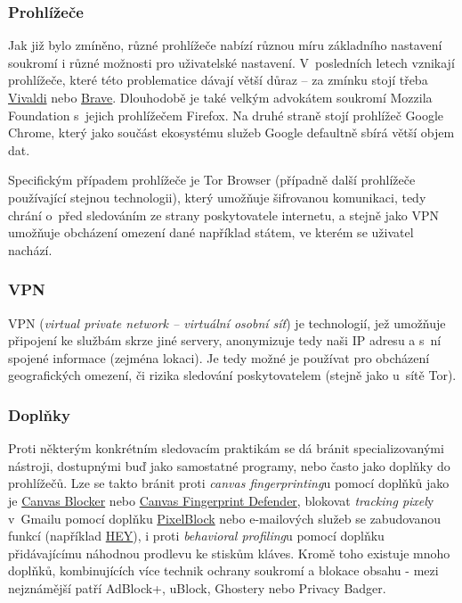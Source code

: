 \subsubsection*{Prohlížeče}
Jak již bylo zmíněno, různé prohlížeče nabízí různou míru základního nastavení soukromí i různé možnosti pro uživatelské nastavení.
V~posledních letech vznikají prohlížeče, které této problematice dávají větší důraz -- za zmínku stojí třeba \href{https://vivaldi.com}{Vivaldi} nebo \href{https://brave.com}{Brave}. Dlouhodobě je také velkým advokátem soukromí Mozzila Foundation s~jejich prohlížečem Firefox.
Na druhé straně stojí prohlížeč Google Chrome, který jako součást ekosystému služeb Google defaultně sbírá větší objem dat.


Specifickým případem prohlížeče je Tor Browser (případně další prohlížeče používající stejnou technologii), který umožňuje šifrovanou komunikaci, tedy chrání o~před sledováním ze strany poskytovatele internetu, a stejně jako VPN umožňuje obcházení omezení dané například státem, ve kterém se uživatel nachází.  

\subsubsection*{VPN}
VPN (\textit{virtual private network -- virtuální osobní síť}) je technologií, jež umožňuje připojení ke službám skrze jiné servery, anonymizuje tedy naši IP adresu a s~ní spojené informace (zejména lokaci). Je tedy možné je používat pro obcházení geografických omezení, či rizika sledování poskytovatelem (stejně jako u~sítě Tor).

\subsubsection*{Doplňky}
Proti některým konkrétním sledovacím praktikám se dá bránit specializovanými nástroji, dostupnými buď jako samostatné programy, nebo často jako doplňky do prohlížečů.
Lze se takto bránit proti \textit{canvas fingerprinting}u pomocí doplňků jako je \href{https://chrome.google.com/webstore/detail/canvas-blocker-fingerprin/nomnklagbgmgghhjidfhnoelnjfndfpd?hl=en}{Canvas Blocker} nebo \href{https://chrome.google.com/webstore/detail/canvas-fingerprint-defend/lanfdkkpgfjfdikkncbnojekcppdebfp?hl=en}{Canvas Fingerprint Defender}, blokovat \textit{tracking pixel}y v~Gmailu pomocí doplňku \href{https://chrome.google.com/webstore/detail/pixelblock/jmpmfcjnflbcoidlgapblgpgbilinlem?hl=en}{PixelBlock} nebo e-mailových služeb se zabudovanou funkcí (například \href{https://hey.com}{HEY}), i proti \textit{behavioral profiling}u pomocí doplňku přidávajícímu náhodnou prodlevu ke stiskům kláves.
Kromě toho existuje mnoho doplňků, kombinujících více technik ochrany soukromí a blokace obsahu - mezi nejznámější patří AdBlock+, uBlock, Ghostery nebo Privacy Badger.

